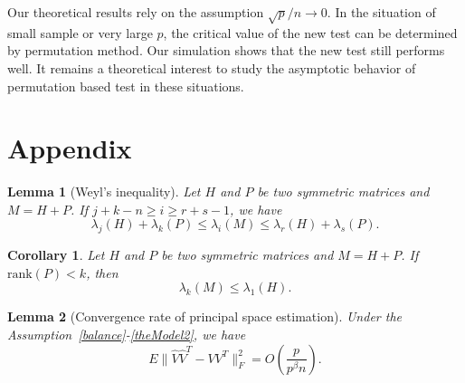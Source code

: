 \documentclass[review]{elsarticle}
\theoremstyle{plain}
\newtheorem{corollary}{\quad\quad Corollary}
\newtheorem{lemma}{\quad\quad Lemma}
\theoremstyle{definition}
\theoremstyle{remark}
\begin{document}
Our theoretical results rely on the assumption $\sqrt{p}/n\to 0$. In the situation of small sample or very large $p$, the critical value of the new test can be determined by permutation method. Our simulation shows that the new test still performs well. It remains a theoretical interest to study the asymptotic behavior of permutation based test in these situations.



\section*{Appendix}


\begin{lemma}[Weyl's inequality]
Let $H$ and $P$ be two symmetric matrices and $M=H+P$. If $j+k-n\geq i\geq r+s-1$, we have
\begin{equation*}
\lambda_j(H)+\lambda_k(P)\leq \lambda_i(M) \leq \lambda_r(H)+\lambda_s(P).
\end{equation*}
\end{lemma}
\begin{corollary}\label{WeylCor}
    Let $H$ and $P$ be two symmetric matrices and $M=H+P$. If $\mathrm{rank}(P)< k$, then
    \begin{equation*}
        \lambda_k(M)\leq \lambda_1(H).
    \end{equation*}
\end{corollary}


\begin{lemma}[Convergence rate of principal space estimation]\label{conRateLemma}
    Under the Assumption~\ref{balance}-\ref{theModel2}, we have
\begin{equation*}
E\|\hat{V}\hat{V}^T-VV^T\|^2_F =O(\frac{p}{p^{\beta}n}).
\end{equation*}
\end{lemma}
\end{document}
